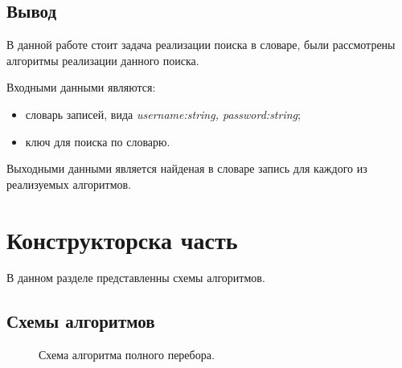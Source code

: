 \documentclass[12pt,a4paper]{report}
\begin{document}
\section*{Вывод}

В данной работе стоит задача реализации поиска в словаре, были рассмотрены алгоритмы реализации данного поиска.

Входными данными являются:

\begin{itemize}
	\item словарь записей, вида \emph{ {username:string, password:string}};
	\item ключ для поиска по словарю.
\end{itemize}

Выходными данными является найденая в словаре запись для каждого из реализуемых алгоритмов.

\newpage
\chapter{Конструкторска часть}

В данном разделе представленны схемы алгоритмов.

\section{Схемы алгоритмов}

\begin{figure}[ht!]
	\caption{Схема алгоритма полного перебора.}
\end{figure}
\end{document}
